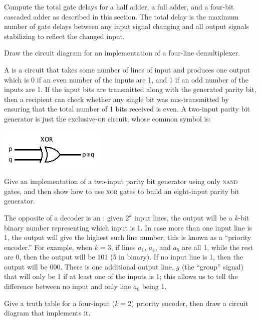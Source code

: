 \begin{exercises}
\problem\label{ex:cascade}Compute the total gate delays for a half adder, a full adder, and a four-bit cascaded adder as described in this section. The total delay is the maximum number of gate delays between any input signal changing and all output signals stabilizing to reflect the changed input.

\problem Draw the circuit diagram for an implementation of a four-line demultiplexer.

\problem A  is a circuit that takes some number of lines of input and produces one output which is 0 if an even number of the inputs are 1, and 1 if an odd number of the inputs are 1. If the input bits are transmitted along with the generated parity bit, then a recipient can check whether any single bit was mis-transmitted by ensuring that the total number of 1 bits received is even. A two-input parity bit generator is just the exclusive-\textsc{or} circuit, whose common symbol is:
\begin{center}
\includegraphics[width=!,height=!,scale=0.75]{graphics/XOR.png}
\end{center}
Give an implementation of a two-input parity bit generator using only \textsc{nand} gates, and then show how to use \textsc{xor} gates to build an eight-input parity bit generator.

\problem The opposite of a decoder is an : given $2^k$ input lines, the output will be a $k$-bit binary number representing which input is 1. In case more than one input line is 1, the output will give the highest such line number; this is known as a ``priority encoder.'' For example, when $k=3$, if lines $a_1$, $a_4$, and $a_5$ are all 1, while the rest are 0, then the output will be 101 (5 in binary). If no input line is 1, then the output will be 000. There is one additional output line, $g$ (the ``group'' signal) that will only be 1 if at least one of the inputs is 1; this allows us to tell the difference between no input and only line $a_0$ being 1.

Give a truth table for a four-input ($k=2$) priority encoder, then draw a circuit diagram that implements it.

\end{exercises}

